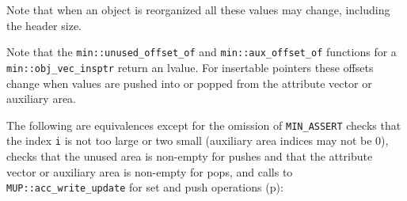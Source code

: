 \documentclass[12pt]{article}
\newcommand{\pagref}[1]{p\pageref{#1}}
\newcommand{\EOL}{\penalty \exhyphenpenalty}
\begin{document}
Note that when an object is reorganized all these values may
change, including the header size.

Note that the {\tt min::\EOL unused\_\EOL offset\_\EOL of} and
{\tt min::\EOL aux\_\EOL offset\_\EOL of} functions for a
{\tt min::\EOL obj\_\EOL vec\_\EOL insptr} return an
lvalue.  For insertable pointers these offsets change when
values are pushed into or popped from the attribute vector or
auxiliary area.

The following are equivalences except for
the omission of {\tt MIN\_\EOL ASSERT} checks that the index \verb|i|
is not too large or two small (auxiliary area indices may not be 0),
checks that the unused area
is non-empty for pushes and that the attribute vector or auxiliary area
is non-empty for pops,
and calls to {\tt MUP::\EOL acc\_\EOL write\_\EOL update}
for set and push operations
(\pagref{MUP::ACC_WRITE_GEN_UPDATE}):
\end{document}
